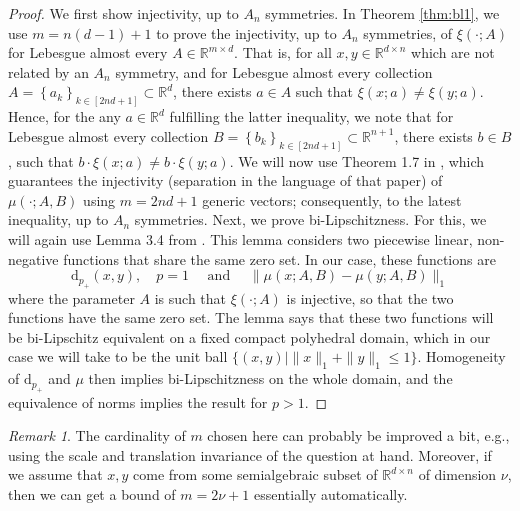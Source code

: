 \documentclass{amsart}
\theoremstyle{plain}
\theoremstyle{definition}
\theoremstyle{remark}
\newtheorem*{remark}{Remark}
\newcommand{\RR}{\mathbb{R}}
\newcommand{\dap}[1]{\mathrm{d}_{#1_+}}
\begin{document}
\begin{proof}
We first show injectivity, up to $A_n$ symmetries. In Theorem \ref{thm:bl1}, we use $m=n(d-1) + 1$ to prove the injectivity, up to $A_n$ symmetries, of $\xi(\cdot; A)$ for Lebesgue almost every $A \in \RR^{m \times d}$. That is, for all $x, y \in \RR^{d \times n}$ which are not related by an $A_n$ symmetry, and for Lebesgue almost every collection $A = \left\{a_k \right\}_{k \in [2nd+1]} \subset \RR^{d}$, there exists $a \in A$ such that $\xi(x; a) \ne \xi(y; a)$. Hence, for the any $a \in \RR^d$ fulfilling the latter inequality, we note that for Lebesgue almost every collection $B = \left\{b_k \right\}_{k \in [2nd+1]} \subset \RR^{n+1}$, there exists $b \in B$, such that $b \cdot \xi(x; a) \ne b\cdot \xi(y; a)$. We will now use Theorem 1.7 in \cite{dym2024low}, which guarantees the injectivity (separation in the language of that paper) of $\mu(\cdot; A, B)$ using $m=2nd+1$ generic vectors; consequently, to the latest inequality, up to $A_n$ symmetries.
Next, we prove bi-Lipschitzness. For this, we will again use Lemma 3.4 from \cite{fswgnn}. This lemma considers two piecewise linear, non-negative functions that share the same zero set. In our case, these functions are 
\begin{equation}
    \dap{p}(x,y), \quad p=1 \quad \text{ and } \quad \| \mu(x;A, B)-\mu(y;A, B)\|_1
\end{equation}
where the parameter $A$ is such that $\xi(\cdot; A)$ is injective, so that the two functions have the same zero set. 
The lemma says that these two functions will be bi-Lipschitz equivalent on a fixed compact polyhedral domain, which in our case we will take to be the unit ball $\{(x,y)\mid \|x\|_1+\|y\|_1\leq 1 \} $. Homogeneity of $\dap{p}$ and $\mu$ then implies bi-Lipschitzness on the whole domain, and the equivalence of norms implies the result for $p>1$.  
\end{proof}
\begin{remark}
The cardinality of $m$ chosen here can probably be improved a bit, e.g., using the scale and translation invariance of the question at hand. Moreover, if we assume that $x,y$ come from some semialgebraic subset of $\RR^{d\times n}$ of dimension $\nu$, then we can get a bound of $m=2\nu+1$ essentially automatically. 
\end{remark}
\end{document}
